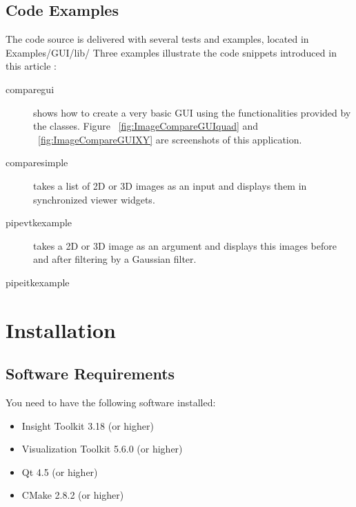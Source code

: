 \documentclass{InsightArticle}
\begin{document}
\subsection*{Code Examples}
The code source is delivered with several tests and examples, located in
Examples/GUI/lib/
Three examples illustrate the code snippets introduced in this article :
\begin{description}
  \item [comparegui] shows how to create a very basic GUI using the
functionalities provided by the  classes. Figure
~\ref{fig:ImageCompareGUIquad} and ~\ref{fig:ImageCompareGUIXY} are screenshots
of this application.
  \item [comparesimple] takes a list of 2D or 3D images as
an input and displays them in synchronized viewer widgets.
  \item [pipevtkexample] takes a 2D or 3D image as an argument and displays this
images before and after filtering by a Gaussian filter.
  \item [pipeitkexample] 
\end{description}


\section{Installation}
\subsection*{Software Requirements}
You need to have the following software installed:
\begin{itemize}
  \item Insight Toolkit 3.18 (or higher)
  \item Visualization Toolkit 5.6.0 (or higher)
  \item Qt 4.5 (or higher)
  \item CMake 2.8.2 (or higher)
\end{itemize}
\end{document}
